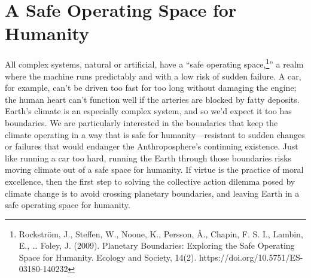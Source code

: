 \documentclass[amstex,12pt]{book}
\begin{document}

\section{A Safe Operating Space for Humanity} \label{Humanities Safe Place}
All complex systems, natural or artificial, have a ``safe operating space,\footnote{Rockstr\"{o}m, J., Steffen, W., Noone, K., Persson, Å., Chapin, F. S. I., Lambin, E., … Foley, J. (2009). Planetary Boundaries: Exploring the Safe Operating Space for Humanity. Ecology and Society, 14(2). https://doi.org/10.5751/ES-03180-140232}'' a realm where the machine runs predictably and with a low risk of sudden failure. A car, for example, can't be driven too fast for too long without damaging the engine; the human heart can't function well if the arteries are blocked by fatty deposits. Earth's climate is an especially complex system, and so we'd expect it too has boundaries. We are particularly interested in the boundaries that keep the climate operating in a way that is safe for humanity---resistant to sudden changes or failures that would endanger the Anthroposphere's continuing existence. Just like running a car too hard, running the Earth through those boundaries risks moving climate out of a safe space for humanity. If virtue is the practice of moral excellence, then the first step to solving the collective action dilemma posed by climate change is to avoid crossing planetary boundaries, and leaving Earth in a safe operating space for humanity.
 
\end{document}
